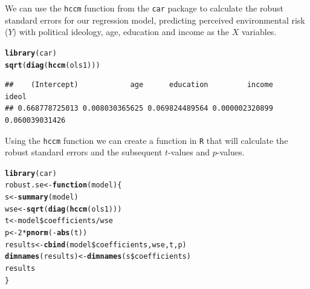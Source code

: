 \documentclass[11pt,openany]{book}\usepackage[]{graphicx}\usepackage[]{color}
\makeatletter
\newcommand{\hlnum}[1]{\textcolor[rgb]{0.686,0.059,0.569}{#1}}%
\newcommand{\hlopt}[1]{\textcolor[rgb]{0,0,0}{#1}}%
\newcommand{\hlstd}[1]{\textcolor[rgb]{0.345,0.345,0.345}{#1}}%
\newcommand{\hlkwa}[1]{\textcolor[rgb]{0.161,0.373,0.58}{\textbf{#1}}}%
\newcommand{\hlkwb}[1]{\textcolor[rgb]{0.69,0.353,0.396}{#1}}%
\newcommand{\hlkwc}[1]{\textcolor[rgb]{0.333,0.667,0.333}{#1}}%
\newcommand{\hlkwd}[1]{\textcolor[rgb]{0.737,0.353,0.396}{\textbf{#1}}}%
\newenvironment{kframe}{%
 \def\at@end@of@kframe{}%
 \ifinner\ifhmode%
  \def\at@end@of@kframe{\end{minipage}}%
  \begin{minipage}{\columnwidth}%
 \fi\fi%
 \def\FrameCommand##1{\hskip\@totalleftmargin \hskip-\fboxsep
 \colorbox{shadecolor}{##1}\hskip-\fboxsep
     \hskip-\linewidth \hskip-\@totalleftmargin \hskip\columnwidth}%
 \MakeFramed {\advance\hsize-\width
   \@totalleftmargin\z@ \linewidth\hsize
   \@setminipage}}%
 {\par\unskip\endMakeFramed%
 \at@end@of@kframe}
\newenvironment{knitrout}{}{} %
\renewenvironment{knitrout}{\begin{singlespace}}{\end{singlespace}}
\makeatother
\begin{document}
We can use the \texttt{hccm} function from the \texttt{car} package to calculate the robust standard errors for our regression model, predicting perceived environmental risk ($Y$) with political ideology, age, education and income as the $X$ variables. 
\begin{knitrout}
\color{fgcolor}\begin{kframe}
\begin{alltt}
\hlkwd{library}\hlstd{(car)}
\hlkwd{sqrt}\hlstd{(}\hlkwd{diag}\hlstd{(}\hlkwd{hccm}\hlstd{(ols1)))}
\end{alltt}
\begin{verbatim}
##    (Intercept)            age      education         income          ideol 
## 0.668778725013 0.008030365625 0.069824489564 0.000002320899 0.060039031426
\end{verbatim}
\end{kframe}
\end{knitrout}

Using the \texttt{hccm} function we can create a function in \texttt{R} that will calculate the robust standard errors and the subsequent $t$-values and $p$-values. 
\begin{knitrout}
\color{fgcolor}\begin{kframe}
\begin{alltt}
\hlkwd{library}\hlstd{(car)}
\hlstd{robust.se} \hlkwb{<-} \hlkwa{function}\hlstd{(}\hlkwc{model}\hlstd{) \{}
    \hlstd{s} \hlkwb{<-} \hlkwd{summary}\hlstd{(model)}
    \hlstd{wse} \hlkwb{<-} \hlkwd{sqrt}\hlstd{(}\hlkwd{diag}\hlstd{(}\hlkwd{hccm}\hlstd{(ols1)))}
    \hlstd{t} \hlkwb{<-} \hlstd{model}\hlopt{\$}\hlstd{coefficients}\hlopt{/}\hlstd{wse}
    \hlstd{p} \hlkwb{<-} \hlnum{2} \hlopt{*} \hlkwd{pnorm}\hlstd{(}\hlopt{-}\hlkwd{abs}\hlstd{(t))}
    \hlstd{results} \hlkwb{<-} \hlkwd{cbind}\hlstd{(model}\hlopt{\$}\hlstd{coefficients, wse, t, p)}
    \hlkwd{dimnames}\hlstd{(results)} \hlkwb{<-} \hlkwd{dimnames}\hlstd{(s}\hlopt{\$}\hlstd{coefficients)}
    \hlstd{results}
\hlstd{\}}
\end{alltt}
\end{kframe}
\end{knitrout}
\end{document}
